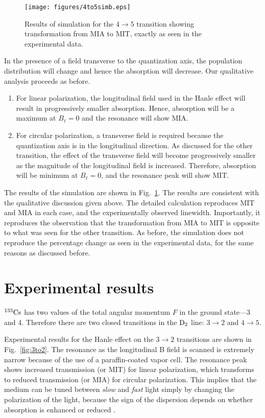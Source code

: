 \begin{figure}[h]
	\centering
	\texttt{[image: figures/4to5simb.eps]}
	\caption{Results of simulation for the $ 4 \rightarrow 5 $ transition showing transformation from MIA to MIT, exactly as seen in the experimental data.}
	\label{fig:4to5sim}
\end{figure}

In the presence of a field transverse to the quantization axis, the population distribution will change and hence the absorption will decrease. Our qualitative analysis proceeds as before. 
\begin{enumerate}
	\item For linear polarization, the longitudinal field used in the Hanle effect will result in progressively smaller absorption. Hence, absorption will be a maximum at $ B_{\ell} =0 $ and the resonance will show MIA.

\item For circular polarization, a transverse field is required because the quantization axis is in the longitudinal direction. As discussed for the other transition, the effect of the transverse field will become progressively smaller as the magnitude of the longitudinal field is increased. Therefore, absorption will be minimum at $ B_{\ell} = 0 $, and the resonance peak will show MIT.
\end{enumerate}

The results of the simulation are shown in Fig.\ \ref{fig:4to5sim}. The results are consistent with the qualitative discussion given above. The detailed calculation reproduces MIT and MIA in each case, and the experimentally observed linewidth. Importantly, it reproduces the observation that the transformation from MIA to MIT is opposite to what was seen for the other transition. As before, the simulation does not reproduce the percentage change as seen in the experimental data, for the same reasons as discussed before.

\section{Experimental results}

${\rm^{133}Cs}$ has two values of the total angular momentum $ F $ in the ground state---3 and 4. Therefore there are two closed transitions in the $\rm D_2 $ line: $ 3 \rightarrow 2 $ and $ 4 \rightarrow 5 $.

Experimental results for the Hanle effect on the $ 3 \rightarrow 2 $ transitions are shown in Fig.\ \ref{fig:3to2}. The resonance as the longitudinal B field is scanned is extremely narrow  because of the use of a paraffin-coated vapor cell. The resonance peak shows increased transmission (or MIT) for linear polarization, which transforms to reduced transmission (or MIA) for circular polarization. This implies that the medium can be tuned between \textit{slow} and \textit{fast} light simply by changing the polarization of the light, because the sign of the dispersion depends on whether absorption is enhanced or reduced \cite{BHN15}.

